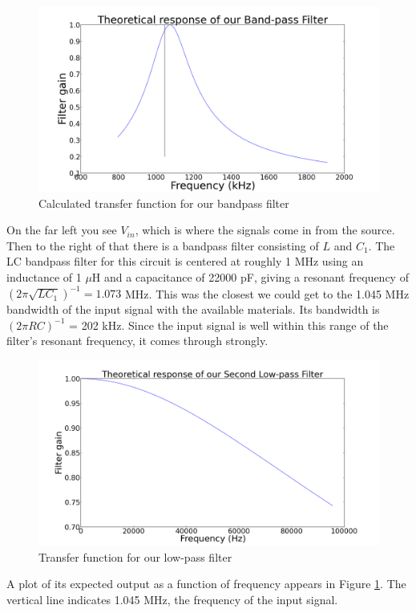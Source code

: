 \documentclass[11pt]{article}
\newcommand{\inv}{^{-1}}
\begin{document}
\begin{figure}
\centering
\includegraphics[scale=0.3]{bandpass}
\caption{Calculated transfer function for our bandpass filter \label{BP}}
\end{figure}
On the far left you see $V_{in}$, which is where the signals come in
from the source. Then to the right of that there is a bandpass filter
consisting of $L$ and $C_1$. The LC bandpass filter for this circuit is
centered at roughly 1 MHz using an inductance of 1 $\mu$H and a capacitance of 22000 pF, giving a resonant frequency of $(2\pi
\sqrt{LC_1})\inv = 1.073$ MHz. This was the closest we could get to the
1.045 MHz bandwidth of the input signal with the available
materials. Its bandwidth is $(2\pi R C)\inv$ = 202 kHz. Since the input signal is well within this range of the filter's
resonant frequency, it comes through strongly. 
\begin{figure}
\centering
\includegraphics[scale=0.3]{lowpass2}
\caption{Transfer function for our low-pass filter \label{TFLP}}
\end{figure}
A plot of its
expected output as a function of frequency appears in Figure \ref{BP}. The vertical
line indicates 1.045 MHz, the frequency of the input signal. 
\\
\end{document}
